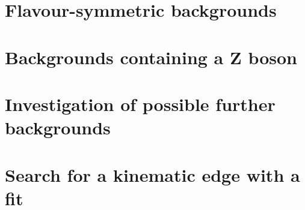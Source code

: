 \section{Flavour-symmetric backgrounds}
\section{Backgrounds containing a Z boson}
\section{Investigation of possible further backgrounds}
\section{Search for a kinematic edge with a fit}